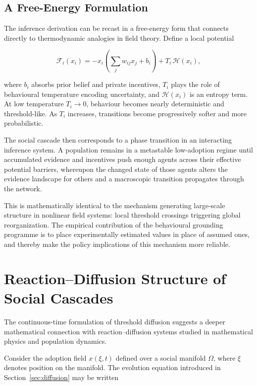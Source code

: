 \documentclass[12pt,a4paper]{article}
\theoremstyle{plain}
\theoremstyle{definition}
\begin{document}
\subsection{A Free-Energy Formulation}

The inference derivation can be recast in a free-energy form that connects directly to thermodynamic analogies in field theory. Define a local potential

\begin{equation}
\mathcal{F}_i(x_i) = -x_i\!\left(\sum_j w_{ij} x_j + b_i\right) + T_i\,\mathcal{H}(x_i),
\end{equation}

where $b_i$ absorbs prior belief and private incentives, $T_i$ plays the role of behavioural temperature encoding uncertainty, and $\mathcal{H}(x_i)$ is an entropy term. At low temperature $T_i \to 0$, behaviour becomes nearly deterministic and threshold-like. As $T_i$ increases, transitions become progressively softer and more probabilistic.

The social cascade then corresponds to a phase transition in an interacting inference system. A population remains in a metastable low-adoption regime until accumulated evidence and incentives push enough agents across their effective potential barriers, whereupon the changed state of those agents alters the evidence landscape for others and a macroscopic transition propagates through the network.

This is mathematically identical to the mechanism generating large-scale structure in nonlinear field systems: local threshold crossings triggering global reorganization. The empirical contribution of the behavioural grounding programme is to place experimentally estimated values in place of assumed ones, and thereby make the policy implications of this mechanism more reliable.

\section{Reaction--Diffusion Structure of Social Cascades}
\label{sec:reactiondiffusion}

The continuous-time formulation of threshold diffusion suggests a deeper mathematical connection with reaction--diffusion systems studied in mathematical physics and population dynamics.

Consider the adoption field $x(\xi,t)$ defined over a social manifold $\Omega$, where $\xi$ denotes position on the manifold. The evolution equation introduced in Section~\ref{sec:diffusion} may be written
\end{document}
